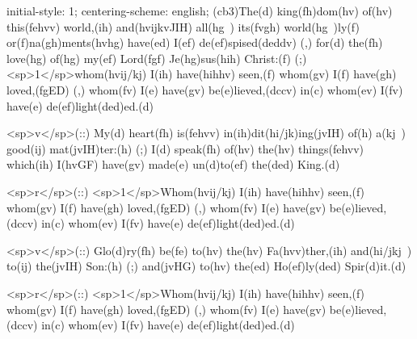 initial-style: 1;
centering-scheme: english;
(cb3)The(d) king(fh)dom(hv) of(hv) this(fehvv) world,(ih) and(hvijkvJIH) all(hg~) its(fvgh) world(hg~)ly(f) or(f)na(gh)ments(hvhg) have(ed) I(ef) de(ef)spised(deddv) (,) for(d) the(fh) love(hg) of(hg) my(ef) Lord(fgf) Je(hg)sus(hih) Christ:(f) (;) <sp>1</sp>whom(hvij/kj) I(ih) have(hihhv) seen,(f) whom(gv) I(f) have(gh) loved,(fgED) (,) whom(fv) I(e) have(gv) be(e)lieved,(dccv) in(c) whom(ev) I(fv) have(e) de(ef)light(ded)ed.(d)

<sp>v</sp>(::) My(d) heart(fh) is(fehvv) in(ih)dit(hi/jk)ing(jvIH) of(h) a(kj~) good(ij) mat(jvIH)ter:(h) (;) I(d) speak(fh) of(hv) the(hv) things(fehvv) which(ih) I(hvGF) have(gv) made(e) un(d)to(ef) the(ded) King.(d) 

<sp>r</sp>(::) <sp>1</sp>Whom(hvij/kj) I(ih) have(hihhv) seen,(f) whom(gv) I(f) have(gh) loved,(fgED) (,) whom(fv) I(e) have(gv) be(e)lieved,(dccv) in(c) whom(ev) I(fv) have(e) de(ef)light(ded)ed.(d)

<sp>v</sp>(::) Glo(d)ry(fh) be(fe) to(hv) the(hv) Fa(hvv)ther,(ih) and(hi/jkj~) to(ij) the(jvIH) Son:(h) (;) and(jvHG) to(hv) the(ed) Ho(ef)ly(ded) Spir(d)it.(d)

<sp>r</sp>(::) <sp>1</sp>Whom(hvij/kj) I(ih) have(hihhv) seen,(f) whom(gv) I(f) have(gh) loved,(fgED) (,) whom(fv) I(e) have(gv) be(e)lieved,(dccv) in(c) whom(ev) I(fv) have(e) de(ef)light(ded)ed.(d)